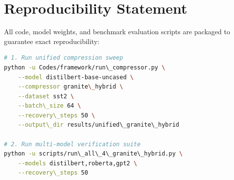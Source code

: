 \section{Reproducibility Statement}
All code, model weights, and benchmark evaluation scripts are packaged to guarantee exact reproducibility:
\begin{lstlisting}[language=bash]
# 1. Run unified compression sweep
python -u Codes/framework/run\_compressor.py \
    --model distilbert-base-uncased \
    --compressor granite\_hybrid \
    --dataset sst2 \
    --batch\_size 64 \
    --recovery\_steps 50 \
    --output\_dir results/unified\_granite\_hybrid

# 2. Run multi-model verification suite
python -u scripts/run\_all\_4\_granite\_hybrid.py \
    --models distilbert,roberta,gpt2 \
    --recovery\_steps 50
\end{lstlisting}
